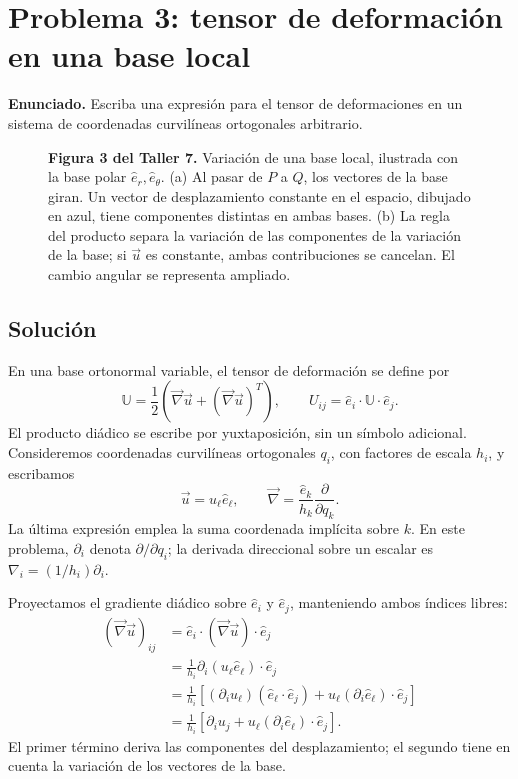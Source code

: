 \documentclass[a4paper]{article}
\begin{document}
\section{Problema 3: tensor de deformación en una base local}

\textbf{Enunciado.} Escriba una expresión para el tensor de deformaciones en un sistema de coordenadas curvilíneas ortogonales arbitrario.

\begin{figure}[H]
\centering

\par\medskip
\begin{minipage}{\textwidth}
\textbf{Figura 3 del Taller 7.} Variación de una base local, ilustrada con la base polar $\hat e_r,\hat e_\theta$. (a) Al pasar de $P$ a $Q$, los vectores de la base giran. Un vector de desplazamiento constante en el espacio, dibujado en azul, tiene componentes distintas en ambas bases. (b) La regla del producto separa la variación de las componentes de la variación de la base; si $\vec u$ es constante, ambas contribuciones se cancelan. El cambio angular se representa ampliado.
\end{minipage}
\end{figure}

\subsection{Solución}

En una base ortonormal variable, el tensor de deformación se define por
\[
\mathbb U=\frac{1}{2}
\left(\vec\nabla\vec u+(\vec\nabla\vec u)^T\right),
\qquad
U_{ij}=\hat e_i\cdot\mathbb U\cdot\hat e_j.
\]
El producto diádico se escribe por yuxtaposición, sin un símbolo adicional. Consideremos coordenadas curvilíneas ortogonales $q_i$, con factores de escala $h_i$, y escribamos
\[
\vec u=u_\ell\hat e_\ell,
\qquad
\vec\nabla=\frac{\hat e_k}{h_k}\frac{\partial}{\partial q_k}.
\]
La última expresión emplea la suma coordenada implícita sobre $k$. En este problema, $\partial_i$ denota $\partial/\partial q_i$; la derivada direccional sobre un escalar es $\nabla_i=(1/h_i)\partial_i$.

Proyectamos el gradiente diádico sobre $\hat e_i$ y $\hat e_j$, manteniendo ambos índices libres:
\[
\begin{aligned}
(\vec\nabla\vec u)_{ij}
&=\hat e_i\cdot(\vec\nabla\vec u)\cdot\hat e_j\\
&=\frac{1}{h_i}\partial_i(u_\ell\hat e_\ell)\cdot\hat e_j\\
&=\frac{1}{h_i}
\left[(\partial_i u_\ell)(\hat e_\ell\cdot\hat e_j)
+u_\ell(\partial_i\hat e_\ell)\cdot\hat e_j\right]\\
&=\frac{1}{h_i}
\left[\partial_i u_j+u_\ell(\partial_i\hat e_\ell)\cdot\hat e_j\right].
\end{aligned}
\]
El primer término deriva las componentes del desplazamiento; el segundo tiene en cuenta la variación de los vectores de la base.
\end{document}
